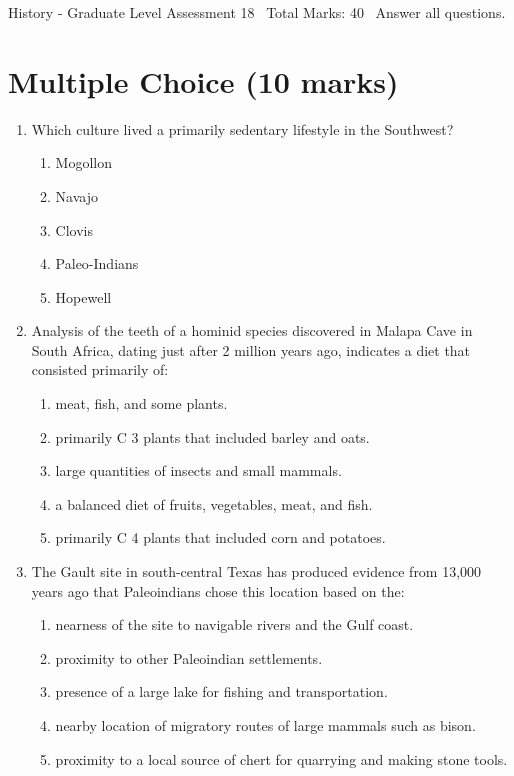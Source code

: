 \documentclass[12pt]{article}
\begin{document}
\begin{center}
History - Graduate Level Assessment 18 \
Total Marks: 40 \
Answer all questions.
\end{center}

\section*{Multiple Choice (10 marks)}
\begin{enumerate}[label=\arabic*.]
\item Which culture lived a primarily sedentary lifestyle in the Southwest?
\begin{enumerate}[label=(\alph*)]
    \item Mogollon
    \item Navajo
    \item Clovis
    \item Paleo-Indians
    \item Hopewell
\end{enumerate}
\item Analysis of the teeth of a hominid species discovered in Malapa Cave in South Africa, dating just after 2 million years ago, indicates a diet that consisted primarily of:
\begin{enumerate}[label=(\alph*)]
    \item meat, fish, and some plants.
    \item primarily C 3 plants that included barley and oats.
    \item large quantities of insects and small mammals.
    \item a balanced diet of fruits, vegetables, meat, and fish.
    \item primarily C 4 plants that included corn and potatoes.
\end{enumerate}
\item The Gault site in south-central Texas has produced evidence from 13,000 years ago that Paleoindians chose this location based on the:
\begin{enumerate}[label=(\alph*)]
    \item nearness of the site to navigable rivers and the Gulf coast.
    \item proximity to other Paleoindian settlements.
    \item presence of a large lake for fishing and transportation.
    \item nearby location of migratory routes of large mammals such as bison.
    \item proximity to a local source of chert for quarrying and making stone tools.

\end{enumerate}
\end{enumerate}
\end{document}
